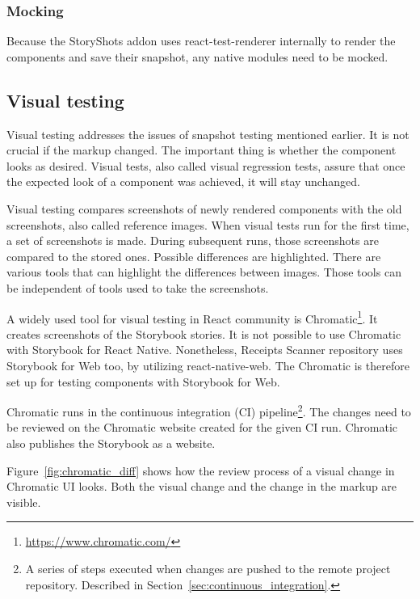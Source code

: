 \documentclass[
  digital, %
  table,   %
  oneside, %
  lof,     %
  lot,     %
]{fithesis3}
\begin{document}
\subsubsection{Mocking}
Because the StoryShots addon uses react-test-renderer internally to render the components and save their snapshot, any native modules need to be mocked.

\subsection{Visual testing}
\label{sec:visual_testing}
Visual testing addresses the issues of snapshot testing mentioned earlier. It is not crucial if the markup changed. The important thing is whether the component looks as desired. Visual tests, also called visual regression tests, assure that once the expected look of a component was achieved, it will stay unchanged.

Visual testing compares screenshots of newly rendered components with the old screenshots, also called reference images.
When visual tests run for the first time, a set of screenshots is made. During subsequent runs, those screenshots are compared to the stored ones. Possible differences are highlighted. There are various tools that can highlight the differences between images. Those tools can be independent of tools used to take the screenshots.

A widely used tool for visual testing in React community is Chromatic\footnote{\url{https://www.chromatic.com/}}. It creates screenshots of the Storybook stories. It is not possible to use Chromatic with Storybook for React Native. Nonetheless, Receipts Scanner repository uses Storybook for Web too, by utilizing react-native-web. The Chromatic is therefore set up for testing components with Storybook for Web.

Chromatic runs in the continuous integration (CI) pipeline\footnote{A series of steps executed when changes are pushed to the remote project repository. Described in Section~\ref{sec:continuous_integration}.}. The changes need to be reviewed on the Chromatic website created for the given CI run. Chromatic also publishes the Storybook as a website.

Figure~\ref{fig:chromatic_diff} shows how the review process of a visual change in Chromatic UI looks. Both the visual change and the change in the markup are visible.
\end{document}
